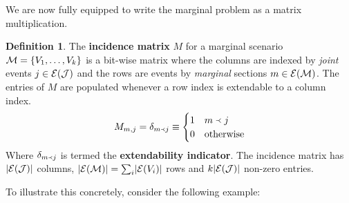 \documentclass[aps, 10pt, english, twoside, pra, nofootinbib, longbibliography]{revtex4-1}
\theoremstyle{plain}
\theoremstyle{definition}
\newtheorem{definition}[theorem]{Definition}
\theoremstyle{remark}
\newcommand{\ext}{\mathrel{\Yleft}}
\newcommand{\mscenario}{\mathcal{M}}
\newcommand{\jointvar}{\mathcal{J}}
\newcommand{\term}[1]{\textcolor{Mahogany}{\textbf{#1}}}
\newcommand{\Events}[1]{\s{E}\br{#1}} %
\begin{document}
    We are now fully equipped to write the marginal problem as a matrix multiplication.
    \begin{definition}
        \label{def:incidence_matrix}
        The \term{incidence matrix} $M$ for a marginal scenario $\mscenario = \bc{V_1, \dots, V_k}$ is a bit-wise matrix where the columns are indexed by \textit{joint} events $j \in \Events{\jointvar}$ and the rows are events by \textit{marginal} sections $m \in \Events{\mscenario}$. The entries of $M$ are populated whenever a row index is extendable to a column index.
        \[ M_{m,j} = \de_{m \ext j} \defined \begin{cases}
            1 & m \ext j \\
            0 & \text{otherwise}
        \end{cases} \]
        Where $\de_{m \ext j}$ is termed the \term{extendability indicator}. The incidence matrix has $\abs{\Events{\jointvar}}$ columns, $\abs{\Events{\mscenario}} = \sum_{i} \abs{\Events{V_i}}$ rows and $k\abs{\Events{\jointvar}}$ non-zero entries.
    \end{definition}
    To illustrate this concretely, consider the following example:
\end{document}
